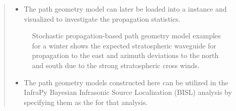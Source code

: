 \documentclass[letterpaper,10pt,english]{sphinxmanual}
\let\sphinxpxdimen\pdfpxdimen\else\newdimen\sphinxpxdimen
\begin{document}
\begin{itemize}
\begin{quote}
\begin{itemize}
\end{itemize}

\begin{sphinxVerbatim}[commandchars=\\\{\}]
  
   
\end{sphinxVerbatim}
\begin{itemize}
\item {} 
The path geometry model can later be loaded into a  instance and visualized to investigate the propagation statistics.

\end{itemize}

\begin{sphinxVerbatim}[commandchars=\\\{\}]
 
\end{sphinxVerbatim}

\begin{figure}[htbp]
\centering
\capstart

\noindent\sphinxincludegraphics[width=850\sphinxpxdimen]{{winter-PGMs}.jpg}
\caption{Stochastic propagation-based path geometry model examples for a winter shows the expected stratospheric waveguide for propagation to the east and azimuth deviations to the north and south due to the strong stratospheric cross winds.}\label{\detokenize{propagation:id3}}\end{figure}
\begin{itemize}
\item {} 
The path geometry models constructed here can be utilized in the InfraPy Bayesian Infrasonic Source Localization (BISL) analysis by specifying them as the  for that analysis.


\end{itemize}
\end{quote}
\end{itemize}
\end{document}
